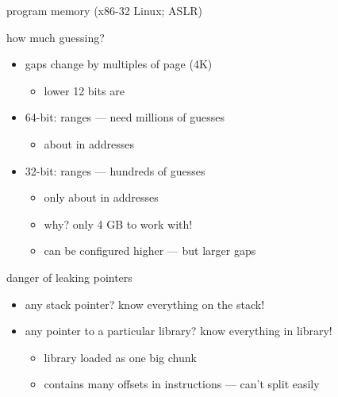 \begin{frame}{program memory (x86-32 Linux; ASLR)}
\end{frame}

\begin{frame}{how much guessing?}
    \begin{itemize}
    \item gaps change by multiples of page (4K)
        \begin{itemize}
        \item lower 12 bits are 
        \end{itemize}
    \item 64-bit:  ranges --- need millions of guesses
        \begin{itemize}
        \item about  in addresses
        \end{itemize}
    \item 32-bit:  ranges --- hundreds of guesses
        \begin{itemize}
        \item only about  in addresses
        \item why? only 4 GB to work with!
        \item can be configured higher --- but larger gaps
        \end{itemize}
    \end{itemize}
\end{frame}

\begin{frame}[fragile,label=noGuessing]{danger of leaking pointers}
    \begin{itemize}
        \item any stack pointer? know everything on the stack!
        \item any pointer to a particular library? know everything in library!
            \begin{itemize}
                \item library loaded as one big chunk
                \item contains many offsets in instructions --- can't split easily
            \end{itemize}
    \end{itemize}
\end{frame}

